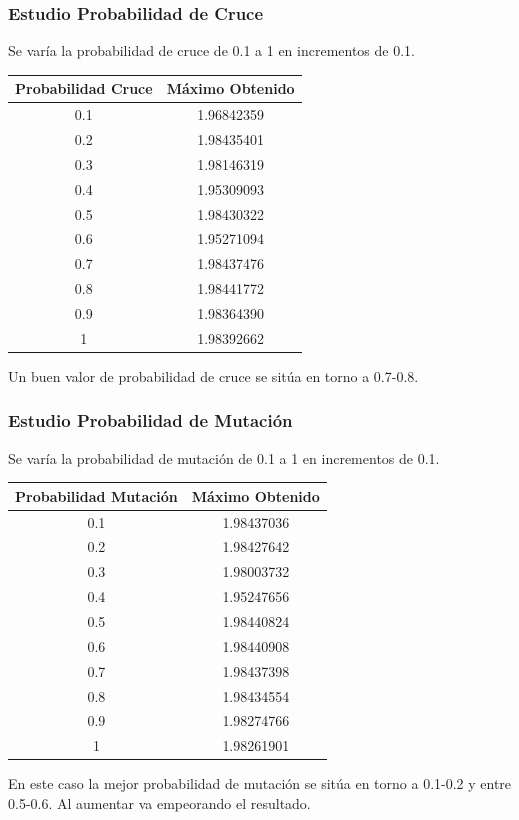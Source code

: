 \documentclass[12pt]{article}
\begin{document}
\subsubsection*{Estudio Probabilidad de Cruce}
	Se varía la probabilidad de cruce de 0.1 a 1 en incrementos de 0.1.
\begin{table}[H]
\begin{center}
\begin{tabular}{|cc|} \hline
Probabilidad Cruce & Máximo Obtenido \\  \hline
0.1 & 1.96842359 \\ 
0.2 & 1.98435401 \\ 
0.3 & 1.98146319 \\
0.4 & 1.95309093 \\
0.5 & 1.98430322 \\
0.6 & 1.95271094 \\
0.7 & 1.98437476 \\
0.8 & 1.98441772 \\ 
0.9 & 1.98364390 \\
1   & 1.98392662 \\  \hline
\end{tabular}
\end{center}
\end{table}
	Un buen valor de probabilidad de cruce se sitúa en torno a 0.7-0.8.

\subsubsection*{Estudio Probabilidad de Mutación}
	Se varía la probabilidad de mutación de 0.1 a 1 en incrementos de 0.1.
\begin{table}[H]
\begin{center}
\begin{tabular}{|cc|} \hline
Probabilidad Mutación & Máximo Obtenido \\  \hline
0.1 & 1.98437036 \\ 
0.2 & 1.98427642 \\ 
0.3 & 1.98003732 \\
0.4 & 1.95247656 \\
0.5 & 1.98440824 \\
0.6 & 1.98440908 \\
0.7 & 1.98437398 \\
0.8 & 1.98434554 \\ 
0.9 & 1.98274766 \\
1   & 1.98261901 \\  \hline
\end{tabular}
\end{center}
\end{table}
	En este caso la mejor probabilidad de mutación se sitúa en torno a 0.1-0.2 y entre 0.5-0.6. Al aumentar va empeorando el resultado.	
\end{document}
